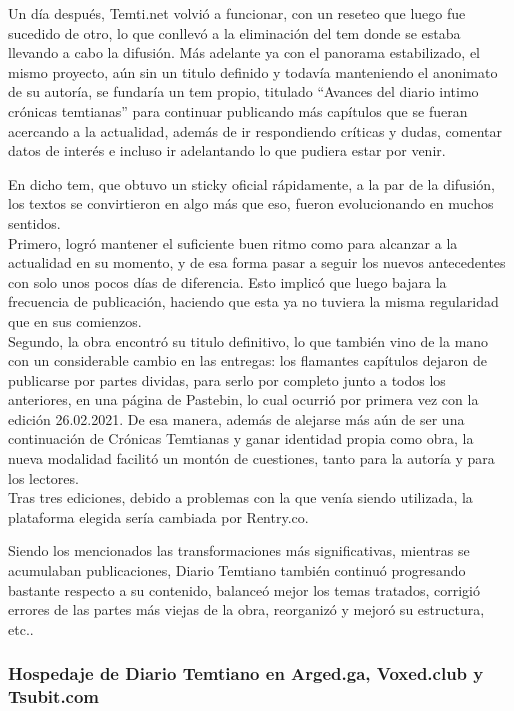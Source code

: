 \documentclass[
  spanish,
]{book}
\begin{document}
Un día después, Temti.net volvió a funcionar, con un reseteo que luego fue sucedido de otro, lo que conllevó a la eliminación del tem donde se estaba llevando a cabo la difusión. Más adelante ya con el panorama estabilizado, el mismo proyecto, aún sin un titulo definido y todavía manteniendo el anonimato de su autoría, se fundaría un tem propio, titulado ``Avances del diario intimo crónicas temtianas'' para continuar publicando más capítulos que se fueran acercando a la actualidad, además de ir respondiendo críticas y dudas, comentar datos de interés e incluso ir adelantando lo que pudiera estar por venir.

En dicho tem, que obtuvo un sticky oficial rápidamente, a la par de la difusión, los textos se convirtieron en algo más que eso, fueron evolucionando en muchos sentidos.\\
Primero, logró mantener el suficiente buen ritmo como para alcanzar a la actualidad en su momento, y de esa forma pasar a seguir los nuevos antecedentes con solo unos pocos días de diferencia. Esto implicó que luego bajara la frecuencia de publicación, haciendo que esta ya no tuviera la misma regularidad que en sus comienzos.\\
Segundo, la obra encontró su titulo definitivo, lo que también vino de la mano con un considerable cambio en las entregas: los flamantes capítulos dejaron de publicarse por partes dividas, para serlo por completo junto a todos los anteriores, en una página de Pastebin, lo cual ocurrió por primera vez con la edición 26.02.2021. De esa manera, además de alejarse más aún de ser una continuación de Crónicas Temtianas y ganar identidad propia como obra, la nueva modalidad facilitó un montón de cuestiones, tanto para la autoría y para los lectores.\\
Tras tres ediciones, debido a problemas con la que venía siendo utilizada, la plataforma elegida sería cambiada por Rentry.co.

Siendo los mencionados las transformaciones más significativas, mientras se acumulaban publicaciones, Diario Temtiano también continuó progresando bastante respecto a su contenido, balanceó mejor los temas tratados, corrigió errores de las partes más viejas de la obra, reorganizó y mejoró su estructura, etc..

\hypertarget{hospedaje-de-diario-temtiano-en-arged.ga-voxed.club-y-tsubit.com}{%
\subsubsection*{Hospedaje de Diario Temtiano en Arged.ga, Voxed.club y Tsubit.com}\label{hospedaje-de-diario-temtiano-en-arged.ga-voxed.club-y-tsubit.com}}
\end{document}
